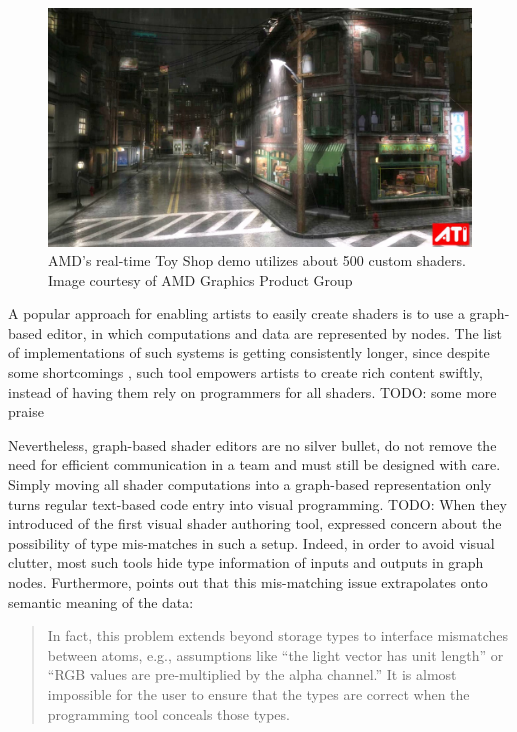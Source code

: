 \begin{figure}[h!]
  \centering
    \includegraphics[width=0.9\linewidth]{./Chapters/ati-demo-toyshop.jpg}
    \caption[ToyShop demo]{AMD's real-time Toy Shop demo utilizes about 500 custom shaders. Image courtesy of AMD Graphics Product Group}
  \label{fig:ATItoyshop}
\end{figure}

A popular approach for enabling artists to easily create shaders is to use a graph-based editor, in which computations and data are represented by nodes. The list of implementations of such systems is getting consistently longer, since despite some shortcomings \cite{ChristerGraphShaderEditorsSuck}, such tool empowers artists to create rich content swiftly, instead of having them rely on programmers for all shaders. TODO: some more praise

Nevertheless, graph-based shader editors are no silver bullet, do not remove the need for efficient communication in a team and must still be designed with care. Simply moving all shader computations into a graph-based representation only turns regular text-based code entry into visual programming. TODO: When they introduced of the first visual shader authoring tool, \citet{AbramWhitted90} expressed concern about the possibility of type mis-matches in such a setup. Indeed, in order to avoid visual clutter, most such tools hide type information of inputs and outputs in graph nodes. Furthermore, \citet{mcguire2006shadetrees} points out that this mis-matching issue extrapolates onto semantic meaning of the data:
	
\begin{quote}	
In fact, this problem extends beyond storage types to interface mismatches between atoms, e.g., assumptions like “the light vector has unit length” or “RGB values are pre-multiplied by the alpha channel.” It is almost impossible for the user to ensure that the types are correct when the programming tool conceals those types. 
\end{quote}

